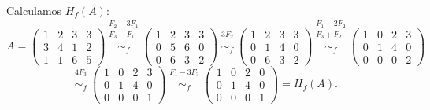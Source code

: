 \documentclass[a4paper,12pt]{article}
\begin{document}
\begin{ejercicio}[title=Ejercicio 11]
Calculamos $H_f(A)$:
\[
A =
\begin{pmatrix}
1 & 2 & 3 & 3\\
3 & 4 & 1 & 2\\
1 & 1 & 6 & 5
\end{pmatrix}
\overset{\substack{F_2 - 3F_1 \\ F_3 - F_1 \\ {}}}{\sim_f}
\begin{pmatrix}
1 & 2 & 3 & 3\\
0 & 5 & 6 & 0\\
0 & 6 & 3 & 2
\end{pmatrix}
\overset{\substack{3F_2 \\ {}}}{\sim_f}
\begin{pmatrix}
1 & 2 & 3 & 3\\
0 & 1 & 4 & 0\\
0 & 6 & 3 & 2
\end{pmatrix}
\overset{\substack{F_1 - 2F_2 \\ F_3 + F_2 \\ {}}}{\sim_f}
\begin{pmatrix}
1 & 0 & 2 & 3\\
0 & 1 & 4 & 0\\
0 & 0 & 0 & 2
\end{pmatrix}
\]
\[
\overset{\substack{4F_3 \\ {}}}{\sim_f}
\begin{pmatrix}
1 & 0 & 2 & 3\\
0 & 1 & 4 & 0\\
0 & 0 & 0 & 1
\end{pmatrix}
\overset{\substack{F_1 - 3F_3 \\ {}}}{\sim_f}
\begin{pmatrix}
1 & 0 & 2 & 0\\
0 & 1 & 4 & 0\\
0 & 0 & 0 & 1
\end{pmatrix}
= H_f(A).
\]

\vspace{0.5em}


\end{ejercicio}
\end{document}
